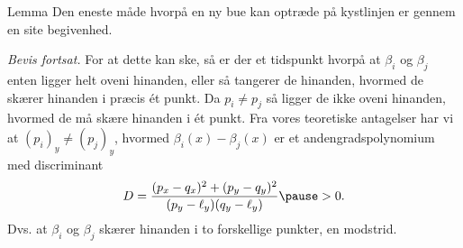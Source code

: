\documentclass{beamer} %
\newcommand{\longpause}{\break \break \pause}
\begin{document}
\begin{frame}
\begin{block}{Lemma}
Den eneste måde hvorpå en ny bue kan optræde på kystlinjen er gennem en site begivenhed.
\end{block}
\textit{Bevis fortsat.} \pause For at dette kan ske, så er der et tidspunkt hvorpå at $\beta_i$ og $\beta_j$ enten ligger helt oveni hinanden\pause, eller så tangerer de hinanden\pause, hvormed de skærer hinanden i præcis ét punkt. \pause Da $p_i \ne p_j$ så ligger de ikke oveni hinanden, hvormed de må skære hinanden i ét punkt.
\longpause
Fra vores teoretiske antagelser har vi at $(p_i)_y \ne (p_j)_y$\pause, hvormed $\beta_i(x) - \beta_j(x)$ er et andengradspolynomium \pause med discriminant
\[
	D = \frac{(p_x - q_x)^2 + (p_y - q_y)^2}{(p_y - \ell_y)(q_y - \ell_y)} \pause > 0.
\]
\pause Dvs. at $\beta_i$ og $\beta_j$ skærer hinanden i to forskellige punkter\pause, en modstrid.
\end{frame}
\end{document}
